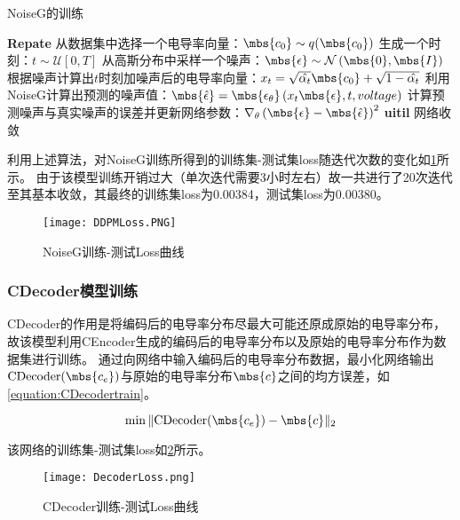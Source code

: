 \begin{algorithm}[H]
    
    \caption{NoiseG的训练}
    \begin{algorithmic}[1]
        \State \textbf{Repate}
        \State 从数据集中选择一个电导率向量：$\mbs{c_0} \sim q(\mbs{c_0})$
        \State 生成一个时刻：$t \sim \mathcal{U}\left[0, T\right]$
        \State 从高斯分布中采样一个噪声：$\mbs{\epsilon} \sim \mathcal{N}\left(\mbs{0}, \mbs{I}\right) $
        \State 根据噪声计算出$t$时刻加噪声后的电导率向量：$x_t = \sqrt{\hat{\alpha_t}}\mbs{c_0} + \sqrt{1-\hat{\alpha_t}}$
        \State 利用NoiseG计算出预测的噪声值：$\mbs{\hat{\epsilon}} = \mbs{\epsilon_{\theta}}\left(x_t\mbs{\epsilon}, t, voltage\right)$
        \State 计算预测噪声与真实噪声的误差并更新网络参数：$\nabla_\theta\left(\mbs{\epsilon} - \mbs{\hat{\epsilon}}\right)^2$
       \State \textbf{uitil} 网络收敛
    \end{algorithmic}
    \label{algorithm:TrainDDPM}
\end{algorithm}

利用上述算法，对NoiseG训练所得到的训练集-测试集loss随迭代次数的变化如\cref{figure:DDPMLoss}所示。
由于该模型训练开销过大（单次迭代需要3小时左右）故一共进行了20次迭代至其基本收敛，其最终的训练集loss为0.00384，测试集loss为0.00380。

\begin{figure}[h]
    \centering
    \texttt{[image: DDPMLoss.PNG]}
    \caption{NoiseG训练-测试Loss曲线}
    \label{figure:DDPMLoss}
\end{figure}

\subsubsection{CDecoder模型训练}

CDecoder的作用是将编码后的电导率分布尽最大可能还原成原始的电导率分布，故该模型利用CEncoder生成的编码后的电导率分布以及原始的电导率分布作为数据集进行训练。
通过向网络中输入编码后的电导率分布数据，最小化网络输出$\text{CDecoder}(\mbs{c_e})$与原始的电导率分布$\mbs{c}$之间的均方误差，如\cref{equation:CDecodertrain}。

\begin{equation}
    \label{equation:CDecodertrain}
    \min \|\text{CDecoder}(\mbs{c_e}) - \mbs{c}\|_2
\end{equation}

该网络的训练集-测试集loss如\cref{figure:DecoderLoss}所示。
\begin{figure}[h]
    \centering
    \texttt{[image: DecoderLoss.png]}
    \caption{CDecoder训练-测试Loss曲线}
    \label{figure:DecoderLoss}
\end{figure} 

